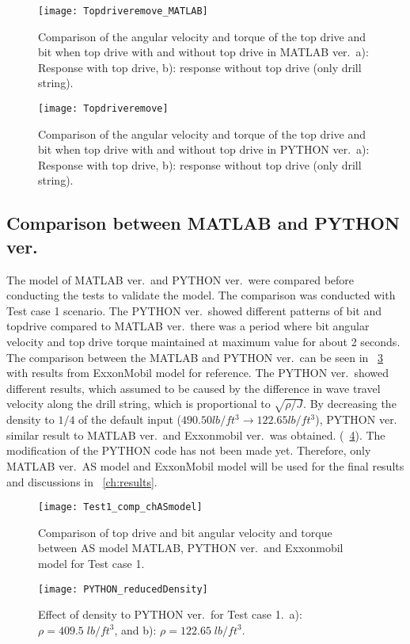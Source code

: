 \begin{figure}[!hbt]
  \centering
  \texttt{[image: Topdriveremove\_MATLAB]}
  \caption[comparison between with and without top drive: Matlab ver]{Comparison of the angular velocity and torque of the top drive and bit when top drive with and without top drive in MATLAB ver.\ a): Response with top drive, b): response without top drive (only drill string).}\label{figure_topdriveremove_MATLAB}
\end{figure}

\begin{figure}[!hbt]
  \centering
  \texttt{[image: Topdriveremove]}
  \caption[comparison between with and without top drive: PYTHON ver]{Comparison of the angular velocity and torque of the top drive and bit when top drive with and without top drive in PYTHON ver.\ a): Response with top drive, b): response without top drive (only drill string).}\label{figure_topdriveremove}
\end{figure}

\subsection{Comparison between MATLAB and PYTHON ver.}
The model of MATLAB ver.\ and PYTHON ver.\ were compared before conducting the tests to validate the model. The comparison was conducted with Test case 1 scenario. The PYTHON ver.\ showed different patterns of bit and topdrive compared to MATLAB ver.\ there was a period where bit angular velocity and top drive torque maintained at maximum value for about 2 seconds. The comparison between the MATLAB and PYTHON ver.\ can be seen in \figurename~\ref{figure_Test1_comp_chASmodel} with results from ExxonMobil model for reference. The PYTHON ver.\ showed different results, which assumed to be caused by the difference in wave travel velocity along the drill string, which is proportional to $\sqrt{\rho/J}$. By decreasing the density to $1/4$ of the default input ($490.50 lb/ft^3 \rightarrow 122.65 lb/ft^3$), PYTHON ver.\, similar result to MATLAB ver.\ and Exxonmobil ver.\ was obtained. (\figurename~\ref{figure_PYTHON_reducedDensity}). The modification of the PYTHON code has not been made yet. Therefore, only MATLAB ver.\ AS model and ExxonMobil model will be used for the final results and discussions in \chaptername~\ref{ch:results}.

\begin{figure}[!hbt]
  \centering
  \texttt{[image: Test1\_comp\_chASmodel]}
  \caption[Comparison between different models for Test case 1]{Comparison of top drive and bit angular velocity and torque between AS model MATLAB, PYTHON ver.\ and Exxonmobil model for Test case 1.}\label{figure_Test1_comp_chASmodel}
\end{figure}

\newpage
\begin{figure}[!htbp]
  \centering
  \texttt{[image: PYTHON\_reducedDensity]}
  \caption[Effect of density to PYTHON ver.\ for Test case 1]{Effect of density to PYTHON ver.\ for Test case 1.\ a): $\rho=409.5\;lb/ft^3$, and b): $\rho=122.65\;lb/ft^3$.}\label{figure_PYTHON_reducedDensity}
\end{figure}


